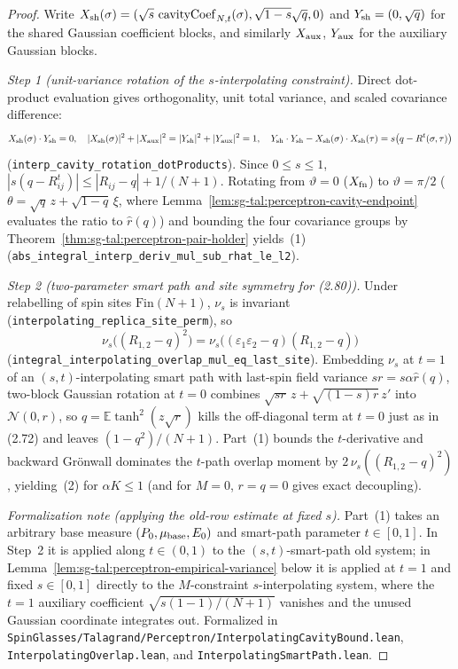 \begin{proof}
  \leanok
Write $X_{\rm sh}(\sigma)=(\sqrt s\,\operatorname{cavityCoef}_{N,t}(\sigma),\sqrt{1-s}\sqrt q,0)$
and $Y_{\rm sh}=(0,\sqrt q)$ for the shared Gaussian coefficient blocks, and similarly $X_{\rm aux}$,
$Y_{\rm aux}$ for the auxiliary Gaussian blocks.

\emph{Step 1 (unit-variance rotation of the $s$-interpolating constraint).} Direct dot-product
evaluation gives orthogonality, unit total variance, and scaled covariance difference:
\[
 X_{\rm sh}(\sigma)\cdot Y_{\rm sh}=0,\quad
 |X_{\rm sh}(\sigma)|^2+|X_{\rm aux}|^2=|Y_{\rm sh}|^2+|Y_{\rm aux}|^2=1,\quad
 Y_{\rm sh}\cdot Y_{\rm sh}-X_{\rm sh}(\sigma)\cdot X_{\rm sh}(\tau)
 =s\bigl(q-R^t(\sigma,\tau)\bigr)
\]
(\texttt{interp\_cavity\_rotation\_dotProducts}). Since $0\le s\le 1$,
$|s(q-R^t_{ij})|\le |R_{ij}-q|+1/(N+1)$. Rotating from $\vartheta=0$ ($X_{\rm fn}$) to
$\vartheta=\pi/2$ ($\theta=\sqrt q\,z+\sqrt{1-q}\,\xi$, where Lemma~\ref{lem:sg-tal:perceptron-cavity-endpoint}
evaluates the ratio to $\widehat r(q)$) and bounding the four covariance groups by
Theorem~\ref{thm:sg-tal:perceptron-pair-holder} yields~(1)
(\texttt{abs\_integral\_interp\_deriv\_mul\_sub\_rhat\_le\_l2}).

\emph{Step 2 (two-parameter smart path and site symmetry for (2.80)).} Under relabelling of spin
sites $\mathrm{Fin}(N+1)$, $\nu_s$ is invariant (\texttt{interpolating\_replica\_site\_perm}), so
\[
 \nu_s\bigl((R_{1,2}-q)^2\bigr)=\nu_s\bigl((\varepsilon_1\varepsilon_2-q)(R_{1,2}-q)\bigr)
\]
(\texttt{integral\_interpolating\_overlap\_mul\_eq\_last\_site}). Embedding $\nu_s$ at $t=1$ of an
$(s,t)$-interpolating smart path with last-spin field variance $s r=s\alpha\widehat r(q)$, two-block
Gaussian rotation at $t=0$ combines $\sqrt{s r}\,z+\sqrt{(1-s)r}\,z'$ into $\mathcal N(0,r)$, so
$q=\mathbb E\tanh^2(z\sqrt r)$ kills the off-diagonal term at $t=0$ just as in (2.72) and leaves
$(1-q^2)/(N+1)$. Part~(1) bounds the $t$-derivative and backward Gr\"onwall dominates the $t$-path
overlap moment by $2\,\nu_s((R_{1,2}-q)^2)$, yielding~(2) for $\alpha K\le 1$ (and for $M=0$,
$r=q=0$ gives exact decoupling).

\emph{Formalization note (applying the old-row estimate at fixed $s$).} Part~(1) takes an arbitrary
base measure $(P_0,\mu_{\rm base},E_0)$ and smart-path parameter $t\in[0,1]$. In Step~2 it is
applied along $t\in(0,1)$ to the $(s,t)$-smart-path old system; in Lemma~\ref{lem:sg-tal:perceptron-empirical-variance}
below it is applied at $t=1$ and fixed $s\in[0,1]$ directly to the $M$-constraint $s$-interpolating
system, where the $t=1$ auxiliary coefficient $\sqrt{s(1-1)/(N+1)}$ vanishes and the unused
Gaussian coordinate integrates out.
Formalized in \texttt{SpinGlasses/Talagrand/Perceptron/InterpolatingCavityBound.lean},
\texttt{InterpolatingOverlap.lean}, and \texttt{InterpolatingSmartPath.lean}.
\end{proof}

